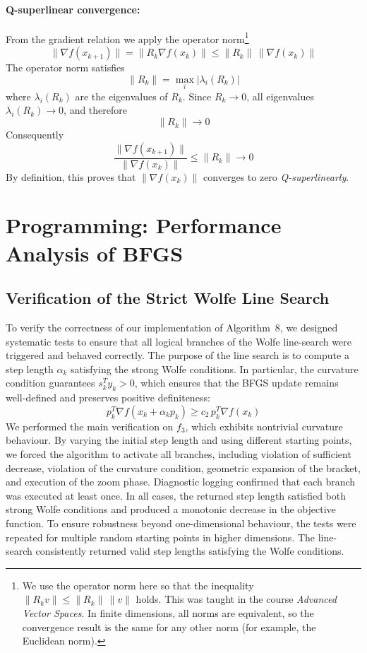 \documentclass[11pt,a4paper]{article}
\begin{document}
\paragraph{Q-superlinear convergence:} From the gradient relation we apply the operator norm\footnote{We use the operator norm here so that the inequality $\|R_k v\| \le \|R_k\|\,\|v\|$ holds. This was taught in the course \emph{Advanced Vector Spaces}. In finite dimensions, all norms are equivalent, so the convergence result is the same for any other norm (for example, the Euclidean norm).}
\[
\|\nabla f(x_{k+1})\|
= \|R_k \nabla f(x_k)\|
\le \|R_k\| \, \|\nabla f(x_k)\|
\]
The operator norm satisfies
\[
\|R_k\| = \max_i |\lambda_i(R_k)|
\]
where $\lambda_i(R_k)$ are the eigenvalues of $R_k$. Since $R_k \to 0$, all eigenvalues $\lambda_i(R_k) \to 0$, and therefore
\[
\|R_k\| \to 0
\]
Consequently
\[
\frac{\|\nabla f(x_{k+1})\|}{\|\nabla f(x_k)\|}
\le \|R_k\|
\to 0
\]
By definition, this proves that $\|\nabla f(x_k)\|$ converges to zero
\emph{Q-superlinearly}.


\section{Programming: Performance Analysis of BFGS}

\subsection{Verification of the Strict Wolfe Line Search}

To verify the correctness of our implementation of Algorithm~8, we designed systematic tests to ensure that all logical branches of the Wolfe line-search were triggered and behaved correctly. The purpose of the line search is to compute a step length $\alpha_k$ 
satisfying the strong Wolfe conditions. In particular, the curvature condition guarantees $s_k^T y_k > 0$, which ensures that the BFGS update remains well-defined and preserves positive definiteness:
\[
p_k^T \nabla f(x_k + \alpha_k p_k)
\ge c_2\, p_k^T \nabla f(x_k)
\]
We performed the main verification on $f_3$, which exhibits nontrivial curvature behaviour. By varying the initial step length and using different starting points, we forced the algorithm to activate all 
branches, including violation of sufficient decrease, violation of the curvature condition, geometric expansion of the bracket, and execution of the zoom phase. Diagnostic logging confirmed that each branch was executed at least once. In all cases, the returned step length satisfied both strong Wolfe conditions and produced a monotonic decrease in the objective function. To ensure robustness beyond one-dimensional behaviour, the tests were repeated for multiple random starting points in higher dimensions. The line-search consistently returned valid step lengths satisfying the Wolfe conditions.
\end{document}
